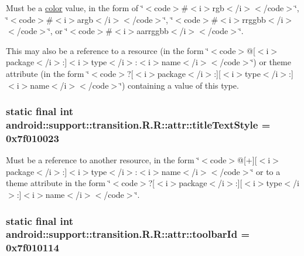 Must be a \hyperlink{classandroid_1_1support_1_1transition_1_1_r_1_1color}{color} value, in the form of \char`\"{}$<$code$>$\#$<$i$>$rgb$<$/i$>$$<$/code$>$\char`\"{}, \char`\"{}$<$code$>$\#$<$i$>$argb$<$/i$>$$<$/code$>$\char`\"{}, \char`\"{}$<$code$>$\#$<$i$>$rrggbb$<$/i$>$$<$/code$>$\char`\"{}, or \char`\"{}$<$code$>$\#$<$i$>$aarrggbb$<$/i$>$$<$/code$>$\char`\"{}. 

This may also be a reference to a resource (in the form \char`\"{}$<$code$>$@\mbox{[}$<$i$>$package$<$/i$>$:\mbox{]}$<$i$>$type$<$/i$>$:$<$i$>$name$<$/i$>$$<$/code$>$\char`\"{}) or theme attribute (in the form \char`\"{}$<$code$>$?\mbox{[}$<$i$>$package$<$/i$>$:\mbox{]}\mbox{[}$<$i$>$type$<$/i$>$:\mbox{]}$<$i$>$name$<$/i$>$$<$/code$>$\char`\"{}) containing a value of this type. \hypertarget{classandroid_1_1support_1_1transition_1_1_r_1_1attr_a88644dfc964f670b65c6505d46246ce}{
\subsubsection[{titleTextStyle}]{\setlength{\rightskip}{0pt plus 5cm}static final int android::support::transition.R.R::attr::titleTextStyle = 0x7f010023}}
\label{classandroid_1_1support_1_1transition_1_1_r_1_1attr_a88644dfc964f670b65c6505d46246ce}


Must be a reference to another resource, in the form \char`\"{}$<$code$>$@\mbox{[}+\mbox{]}\mbox{[}$<$i$>$package$<$/i$>$:\mbox{]}$<$i$>$type$<$/i$>$:$<$i$>$name$<$/i$>$$<$/code$>$\char`\"{} or to a theme attribute in the form \char`\"{}$<$code$>$?\mbox{[}$<$i$>$package$<$/i$>$:\mbox{]}\mbox{[}$<$i$>$type$<$/i$>$:\mbox{]}$<$i$>$name$<$/i$>$$<$/code$>$\char`\"{}. \hypertarget{classandroid_1_1support_1_1transition_1_1_r_1_1attr_d90d56a0c047654d5b27e87b02607a29}{
\subsubsection[{toolbarId}]{\setlength{\rightskip}{0pt plus 5cm}static final int android::support::transition.R.R::attr::toolbarId = 0x7f010114}}
\label{classandroid_1_1support_1_1transition_1_1_r_1_1attr_d90d56a0c047654d5b27e87b02607a29}


